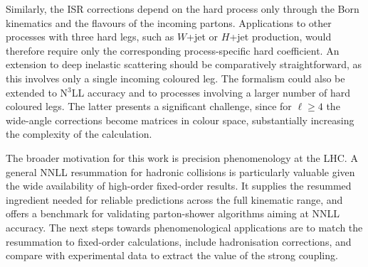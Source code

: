 Similarly, the ISR corrections depend on the hard process only through the Born kinematics and the flavours of the incoming partons. Applications to other processes with three hard legs, such as $W$+jet or $H$+jet production, would therefore require only the corresponding process-specific hard coefficient. An
extension to deep inelastic scattering should be comparatively
straightforward, as this involves only a single incoming coloured leg. 
The formalism could also be extended to N$^3$LL accuracy
and to processes involving a larger number of hard coloured legs. The
latter presents a significant challenge, since for
$\ell\geq4$ the wide-angle corrections become matrices in colour space,
substantially increasing the complexity of the calculation.

The broader motivation for this work is precision phenomenology at the LHC. A
general NNLL resummation for hadronic collisions is particularly valuable
given the wide availability of high-order fixed-order results. It supplies the
resummed ingredient needed for reliable predictions across the full kinematic
range, and offers a benchmark for validating parton-shower algorithms aiming
at NNLL accuracy. The next steps towards phenomenological applications are 
to match the resummation to fixed-order calculations, include hadronisation corrections, 
and compare with experimental data to extract the value of the strong coupling.

